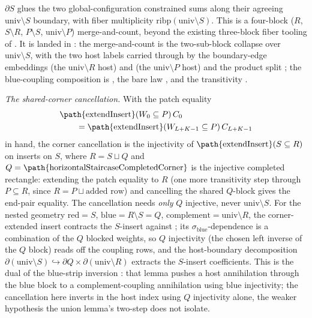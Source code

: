 \documentclass{article}
\begin{document}
$\partial S$ glues the two global-configuration constrained sums along their
agreeing $\mathrm{univ} \setminus S$ boundary, with fiber multiplicity
$\mathrm{ribp}(\mathrm{univ} \setminus S)$. This is a four-block ($R$,
$S \setminus R$, $P \setminus S$, $\mathrm{univ} \setminus P$) merge-and-count,
beyond the existing three-block fiber tooling of
. It is landed in
: the merge-and-count is the two-sub-block
collapse  over $\mathrm{univ} \setminus S$, with the two host
labels carried through by the boundary-edge embeddings
 (the $\mathrm{univ}\setminus R$
host) and  (the
$\mathrm{univ}\setminus P$ host) and the product split ; the
blue-coupling composition is , the bare law
, and the transitivity .

\emph{The shared-corner cancellation.} With the patch equality
\begin{align*}
    &\text{\path{extendInsert}} (W_0 \subseteq P)\, C_0\\
    &\qquad = \text{\path{extendInsert}} (W_{L+K-1} \subseteq P)\, C_{L+K-1}
\end{align*}
in hand, the corner cancellation is the injectivity of
$\text{\path{extendInsert}} (S \subseteq R)$ on inserts on $S$, where $R = S \sqcup Q$
and $Q = \text{\path{horizontalStaircaseCompletedCorner}}$ is the injective completed
rectangle: extending the patch equality to $R$ (one more transitivity step
through $P \subseteq R$, since $R = P \sqcup \text{added row}$) and cancelling
the shared $Q$-block gives the end-pair equality. The cancellation needs
\emph{only} $Q$ injective, never $\mathrm{univ} \setminus S$. For the nested
geometry $\mathrm{red} = S$, $\mathrm{blue} = R \setminus S = Q$,
$\mathrm{complement} = \mathrm{univ} \setminus R$, the corner-extended insert
contracts the $S$-insert against ;
its $\sigma_{\mathrm{blue}}$-dependence is a combination of the $Q$ blocked
weights, so $Q$ injectivity (the chosen left inverse
 of the $Q$ block) reads off
the coupling rows, and the host-boundary decomposition $\partial(\mathrm{univ}
    \setminus S) \hookrightarrow \partial Q \times \partial(\mathrm{univ}\setminus R)$
extracts the $S$-insert coefficients. This is the dual of the blue-strip
inversion : that lemma
pushes a host annihilation through the blue block to a complement-coupling
annihilation using $\mathrm{blue}$ injectivity; the cancellation here inverts in
the host index using $Q$ injectivity alone, the weaker hypothesis the union
lemma's two-step does not isolate.
\end{document}
